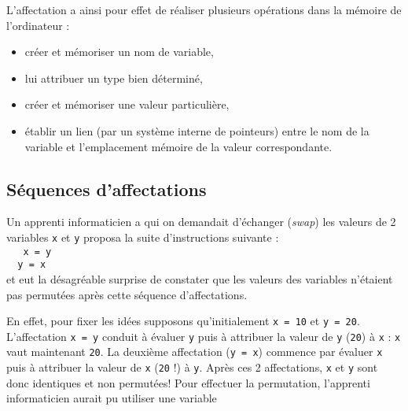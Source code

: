 L'affectation a ainsi pour effet de réaliser plusieurs opérations dans la mémoire de l'ordinateur :
\begin{itemize}
\item créer et mémoriser un nom de variable,
\item lui attribuer un type bien déterminé,
\item créer et mémoriser une valeur particulière,
\item établir un lien (par un système interne de pointeurs) entre le nom de la variable 
	et l'emplacement mémoire de la valeur correspondante.
\end{itemize}


\subsection{Séquences d'affectations}
\begin{ex}\label{ex:swap}
Un apprenti informaticien a qui on demandait d'échanger ({\em swap}) les valeurs
de 2 variables {\tt x} et {\tt y} proposa la suite d'instructions suivante :\\
{\footnotesize\tt
\mbox{}\ \ x = y\\
\mbox{}\ \ y = x\\}
et eut la désagréable surprise de constater que les valeurs des variables 
n'étaient pas permutées après cette séquence d'affectations.
\end{ex}
\noindent En effet, pour fixer les idées supposons qu'initialement {\tt x = 10} et {\tt y = 20}.
L'affectation {\tt x = y} conduit à évaluer {\tt y} puis à attribuer la valeur de {\tt y} ({\tt 20})
à {\tt x} : {\tt x} vaut maintenant {\tt 20}. La deuxième affectation ({\tt y = x}) 
commence par évaluer {\tt x} puis à attribuer la valeur de {\tt x} ({\tt 20} !) à {\tt y}.
Après ces 2 affectations, {\tt x} et {\tt y} sont donc identiques et non permutées! 
Pour effectuer la permutation, l'apprenti informaticien aurait pu utiliser une variable 

